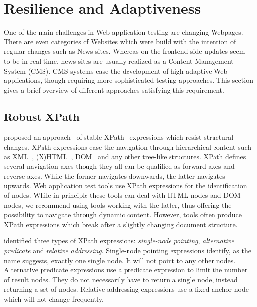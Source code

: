 \documentclass[12pt, notitlepage]{article}
\begin{document}
\section{Resilience and Adaptiveness}
One of the main challenges in Web application testing are changing Webpages. There are even categories of Websites which were build with the intention of regular
changes such as News sites. Whereas on the frontend side updates seem to be in real time, news sites are usually realized as a Content Management System (CMS). 
CMS systems ease the development of high adaptive Web applications, though requiring more sophisticated testing approaches. This section gives a brief overview 
of different approaches satisfying this requirement. 
\subsection{Robust XPath}
\citeauthor{robust-xpath} proposed an approach~\cite{robust-xpath} of stable XPath~\cite{xpath} expressions which resist structural changes.
XPath expressions ease the navigation through hierarchical content such as XML~\cite{xml}, (X)HTML~\cite{html}, DOM~\cite{dom} and any other tree-like structures.
XPath defines several navigation axes though they all can be qualified as forward axes and reverse axes. While the former navigates downwards,
the latter navigates upwards. Web application test tools use XPath expressions for the identification of nodes. While in principle these tools can deal with HTML
nodes and DOM nodes, we recommend using tools working with the latter, thus offering the possibility to navigate through dynamic content. 
However, tools often produce XPath expressions which break after a slightly changing document structure. 

\citeauthor{robust-xpath} identified three types of XPath expressions: \textit{single-node pointing}, \textit{alternative predicate} and \textit{relative addressing}. 
Single-node pointing expressions identify, as the name suggests, exactly one single node. It will not point to any other nodes. Alternative predicate expressions
use a predicate expression to limit the number of result nodes. They do not necessarily have to return a single node, instead returning a set of nodes.
Relative addressing expressions use a fixed anchor node which will not change frequently.
\end{document}

